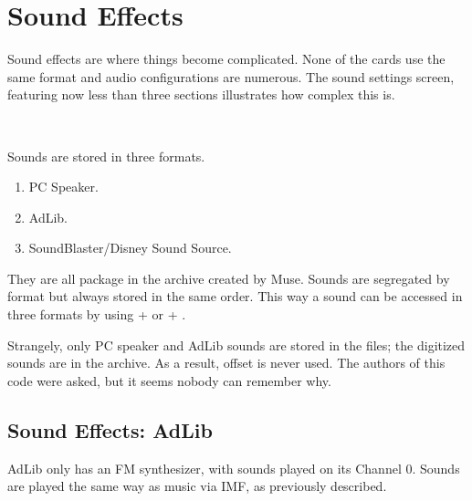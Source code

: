 \section{Sound Effects}
Sound effects are where things become complicated. None of the cards use the same format and audio configurations are numerous. The sound settings screen, featuring now less than three sections illustrates how complex this is.\\
\par
{}\\
\par

\par
Sounds are stored in three formats.
\begin{enumerate}
\item PC Speaker.
\item AdLib.
\item SoundBlaster/Disney Sound Source.
\end{enumerate}
They are all package in the  archive created by Muse. Sounds are segregated by format but always stored in the same order. This way a sound can be accessed in three formats by using  +  or  + .\\
\par
Strangely, only PC speaker and AdLib sounds are stored in the  files; the digitized sounds are in the  archive. As a result, offset  is never used. The authors of this code were asked, but it seems nobody can remember why.\\
\par
\begin{minipage}{\textwidth}

\end{minipage}
\pagebreak




\subsection{Sound Effects: AdLib}
AdLib only has an FM synthesizer, with sounds played on its Channel 0. Sounds are played the same way as music via IMF, as previously described.\\












